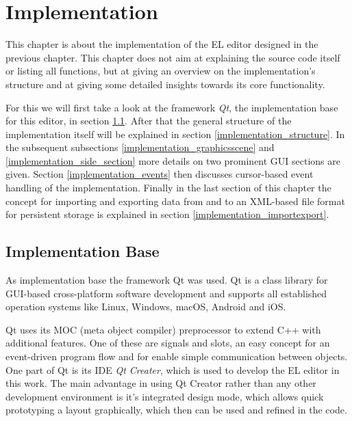 \documentclass[twoside, openright, 12pt]{book}
\begin{document}
\cleardoublepage
\chapter{Implementation}
\label{implementation}
This chapter is about the implementation of the EL editor designed in the previous chapter.
This chapter does not aim at explaining the source code itself or listing all functions, but at giving an overview on the implementation's structure and at giving some detailed insights towards its core functionality.

For this we will first take a look at the framework \textit{Qt}, the implementation base for this editor, in section \ref{implementation_base}.
After that the general structure of the implementation itself will be explained in section \ref{implementation_structure}.
In the subsequent subsections \ref{implementation_graphicsscene} and \ref{implementation_side_section} more details on two prominent GUI sections are given.
Section \ref{implementation_events} then discusses cursor-based event handling of the implementation.
Finally in the last section of this chapter the concept for importing and exporting data from and to an XML-based file format for persistent storage is explained in section \ref{implementation_importexport}.



\section{Implementation Base}
\label{implementation_base}
As implementation base the framework Qt was used.
Qt is a class library for GUI-based cross-platform software development and supports all established operation systems like Linux, Windows, macOS, Android and iOS.

Qt uses its MOC (meta object compiler) preprocessor to extend C++ with additional features.
One of these are signals and slots, an easy concept for an event-driven program flow and for enable simple communication between objects.
One part of Qt is its IDE \textit{Qt Creater}, which is used to develop the EL editor in this work.
The main advantage in using Qt Creator rather than any other development environment is it's integrated design mode, which allows quick prototyping a layout graphically, which then can be used and refined in the code.
\end{document}
